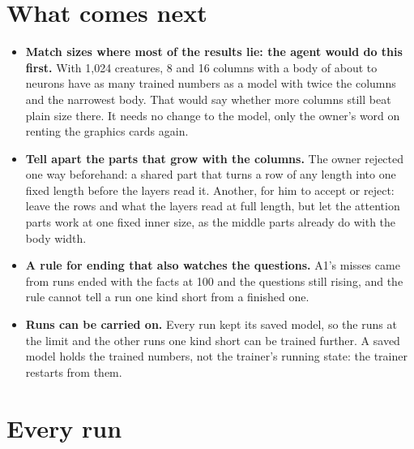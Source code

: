 \documentclass[10pt,letterpaper]{article}
\newcommand{\lead}[1]{\textbf{#1}}               %
\begin{document}
\section{What comes next}

\begin{itemize}
\item \lead{Match sizes where most of the results lie: the agent would do this first.} With 1,024 creatures,
      8 and 16 columns with a body of about \NextBodyLow{} to \NextBodyHigh{} neurons have as many trained
      numbers as a model with twice the columns and the narrowest body. That would say whether more columns
      still beat plain size there. It needs no change to the model, only the owner's word on renting the graphics
      cards again.
\item \lead{Tell apart the parts that grow with the columns.} The owner rejected one way beforehand: a shared
      part that turns a row of any length into one fixed length before the layers read it. Another, for him to
      accept or reject: leave the rows and what the layers read at full length, but let the attention parts
      work at one fixed inner size, as the middle parts already do with the body width.
\item \lead{A rule for ending that also watches the questions.} A1's misses came from runs ended with the facts
      at 100 and the questions still rising, and the rule cannot tell a run one kind short from a finished one.
\item \lead{Runs can be carried on.} Every run kept its saved model, so the \LimitRuns{} runs at the limit and
      the other \PlateauOthers{} runs one kind short can be trained further. A saved model holds the trained
      numbers, not the trainer's running state: the trainer restarts from them.
\end{itemize}

\Needspace{0.85in}
\section{Every run}
\end{document}
